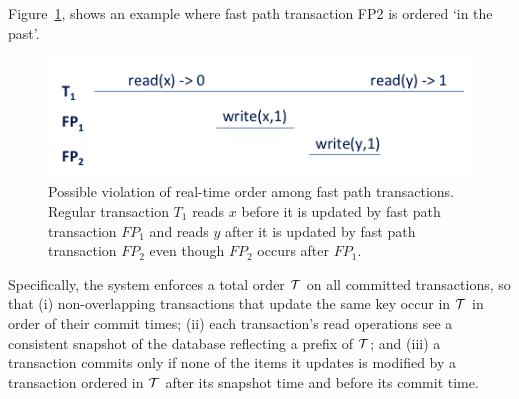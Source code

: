 {{Figure~\ref{fig:ltx-rt}, shows an example where fast path transaction FP2 is ordered `in the past'.

\begin{figure}[ht]
\includegraphics[width=\columnwidth]{figs/FP-semantics}
\caption{Possible violation of real-time order among fast path transactions. Regular transaction $T_1$
reads $x$ before it is updated by fast path transaction $FP_1$ and reads $y$ after it is updated by fast path transaction $FP_2$ even 
though $FP_2$ occurs after $FP_1$. 
}
\label{fig:ltx-rt}
\end{figure}
} %
Specifically, %
the system enforces a total order ${\cal T}$ on all committed transactions, so that
(i) non-overlapping transactions 
that update the same key occur in ${\cal T}$  in order of their commit times;
(ii) each  transaction's read operations see a consistent snapshot of the database reflecting 
a prefix of  ${\cal T}$; 
 and (iii) a transaction commits only if none of the items it updates is modified by a transaction ordered in ${\cal T}$ after
 its snapshot time and before its commit time.

 
}
